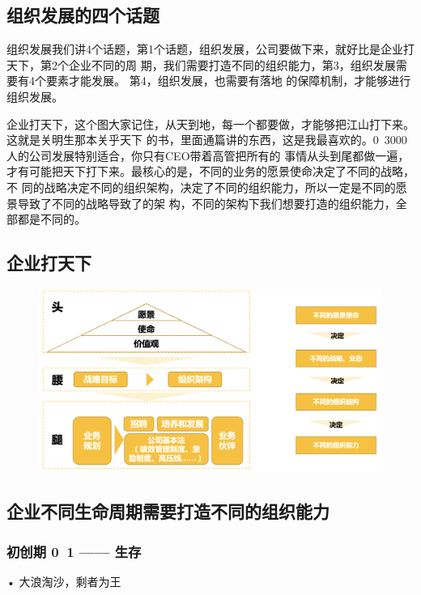 \documentclass[12pt]{article}
\begin{document}
\subsection{组织发展的四个话题}
组织发展我们讲4个话题，第1个话题，组织发展，公司要做下来，就好比是企业打天下，第2个企业不同的周 期，我们需要打造不同的组织能力，第3，组织发展需要有4个要素才能发展。 第4，组织发展，也需要有落地 的保障机制，才能够进行组织发展。

企业打天下，这个图大家记住，从天到地，每一个都要做，才能够把江山打下来。这就是关明生那本关乎天下 的书，里面通篇讲的东西，这是我最喜欢的。0~3000人的公司发展特别适合，你只有CEO带着高管把所有的 事情从头到尾都做一遍，才有可能把天下打下来。最核心的是，不同的业务的愿景使命决定了不同的战略，不 同的战略决定不同的组织架构，决定了不同的组织能力，所以一定是不同的愿景导致了不同的战略导致了的架 构，不同的架构下我们想要打造的组织能力，全部都是不同的。

\subsection{企业打天下}
\begin{figure}[H]
    \centering
    \includegraphics[width=1\textwidth]{fig/Ali_Performance_13.png}
\end{figure}

\subsection{企业不同生命周期需要打造不同的组织能力}
\subsubsection{初创期 0~1 —— 生存}
• 大浪淘沙，剩者为王
\end{document}
